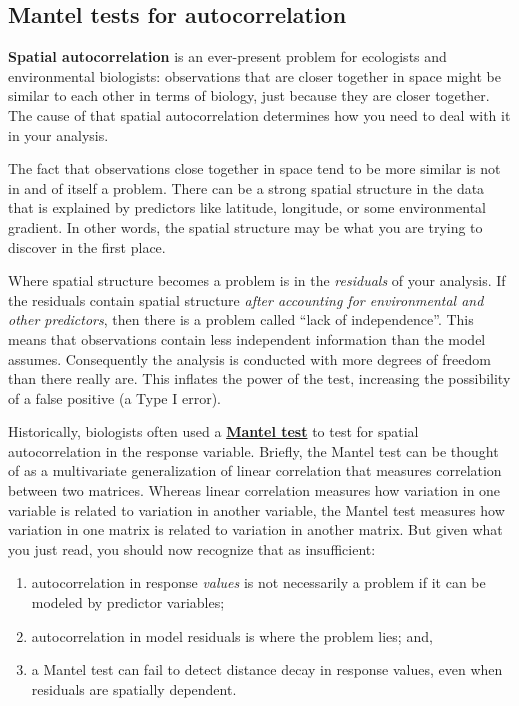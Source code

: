 \documentclass[
  13,
  letterpaper,
]{report}
\providecommand{\tightlist}{%
  \setlength{\itemsep}{0pt}\setlength{\parskip}{0pt}}
\begin{document}
\subsection{Mantel tests for
autocorrelation}\label{sec-problems-auto-mantel}

\textbf{Spatial autocorrelation} is an ever-present problem for
ecologists and environmental biologists: observations that are closer
together in space might be similar to each other in terms of biology,
just because they are closer together. The cause of that spatial
autocorrelation determines how you need to deal with it in your
analysis.

The fact that observations close together in space tend to be more
similar is not in and of itself a problem. There can be a strong spatial
structure in the data that is explained by predictors like latitude,
longitude, or some environmental gradient. In other words, the spatial
structure may be what you are trying to discover in the first place.

Where spatial structure becomes a problem is in the \emph{residuals} of
your analysis. If the residuals contain spatial structure \emph{after
accounting for environmental and other predictors}, then there is a
problem called ``lack of independence''. This means that observations
contain less independent information than the model assumes.
Consequently the analysis is conducted with more degrees of freedom than
there really are. This inflates the power of the test, increasing the
possibility of a false positive (a Type I error).

Historically, biologists often used a
\href{@sec-mtest-mantel}{\textbf{Mantel test}} to test for spatial
autocorrelation in the response variable. Briefly, the Mantel test can
be thought of as a multivariate generalization of linear correlation
that measures correlation between two matrices. Whereas linear
correlation measures how variation in one variable is related to
variation in another variable, the Mantel test measures how variation in
one matrix is related to variation in another matrix. But given what you
just read, you should now recognize that as insufficient:

\begin{enumerate}
\def\labelenumi{\arabic{enumi}.}
\tightlist
\item
  autocorrelation in response \emph{values} is not necessarily a problem
  if it can be modeled by predictor variables;
\item
  autocorrelation in model residuals is where the problem lies; and,
\item
  a Mantel test can fail to detect distance decay in response values,
  even when residuals are spatially dependent.
\end{enumerate}
\end{document}
